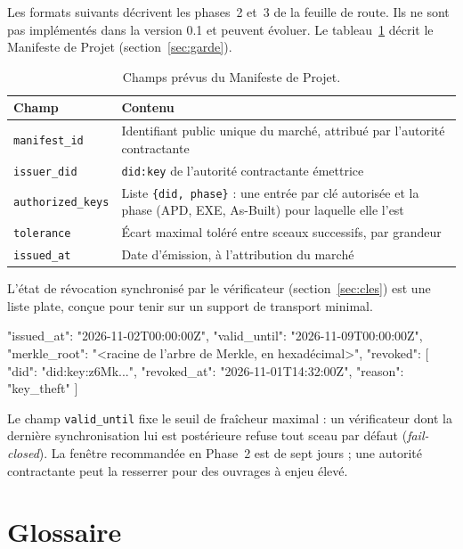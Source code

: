 \documentclass[11pt,a4paper]{article}
\begin{document}
Les formats suivants décrivent les phases~2 et~3 de la feuille de route. Ils ne sont pas implémentés dans la version 0.1 et peuvent évoluer. Le tableau~\ref{tab:manifeste} décrit le Manifeste de Projet (section~\ref{sec:garde}).

\begin{table}[H]\centering\small
\caption{Champs prévus du Manifeste de Projet.}\label{tab:manifeste}
\begin{tabularx}{\linewidth}{@{}p{2.8cm}X@{}}
\toprule
\textbf{Champ} & \textbf{Contenu} \\
\midrule
\texttt{manifest\_id} & Identifiant public unique du marché, attribué par l'autorité contractante \\
\texttt{issuer\_did} & \texttt{did:key} de l'autorité contractante émettrice \\
\texttt{authorized\_keys} & Liste \texttt{\{did, phase\}} : une entrée par clé autorisée et la phase (APD, EXE, As-Built) pour laquelle elle l'est \\
\texttt{tolerance} & Écart maximal toléré entre sceaux successifs, par grandeur \\
\texttt{issued\_at} & Date d'émission, à l'attribution du marché \\
\bottomrule
\end{tabularx}
\end{table}

L'état de révocation synchronisé par le vérificateur (section~\ref{sec:cles}) est une liste plate, conçue pour tenir sur un support de transport minimal.

\begin{code}
{
  "issued_at": "2026-11-02T00:00:00Z",
  "valid_until": "2026-11-09T00:00:00Z",
  "merkle_root": "<racine de l'arbre de Merkle, en hexadécimal>",
  "revoked": [
    { "did": "did:key:z6Mk...", "revoked_at": "2026-11-01T14:32:00Z", "reason": "key_theft" }
  ]
}
\end{code}

Le champ \texttt{valid\_until} fixe le seuil de fraîcheur maximal : un vérificateur dont la dernière synchronisation lui est postérieure refuse tout sceau par défaut (\emph{fail-closed}). La fenêtre recommandée en Phase~2 est de sept jours ; une autorité contractante peut la resserrer pour des ouvrages à enjeu élevé.

\section{Glossaire}\label{sec:glossaire}
\end{document}
